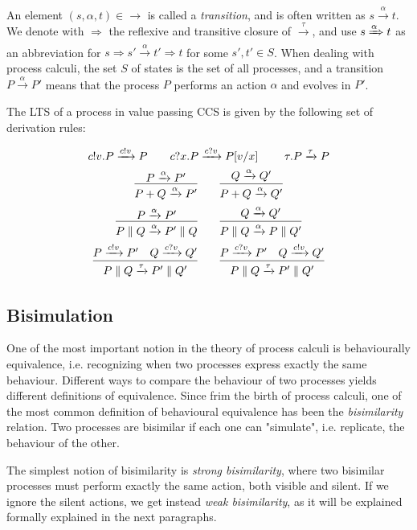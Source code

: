 An element $(s, \alpha, t) \in \rightarrow$ is called a \textit{transition}, and is often written as $s \xrightarrow{\alpha} t$. We denote with $\Rightarrow$ the reflexive and transitive closure of $\xrightarrow{\tau}$, and use $s \xRightarrow{\alpha} t$ as an abbreviation for $s \Rightarrow s' \xrightarrow{\alpha} t' \Rightarrow t$ for some $s', t' \in S$. When dealing with process calculi, the set $S$ of states is the set of all processes, and a transition $P \xrightarrow{\alpha} P'$ means that the process $P$ performs an action $\alpha$ and evolves in $P'$.

The LTS of a process in value passing CCS is given by the following set of derivation rules: 

\begin{gather*}
c!v.P \xrightarrow{c!v} P \qquad c?x.P \xrightarrow{c?v} P[v/x] \qquad \	\tau.P \xrightarrow{\tau} P
\\
\infer{P + Q \xrightarrow{\alpha} P'}{P \xrightarrow{\alpha} P'} \qquad \infer{P + Q \xrightarrow{\alpha} Q'}{Q \xrightarrow{\alpha} Q'} 
\\
\infer{P \parallel Q \xrightarrow{\alpha} P'\parallel Q}{P \xrightarrow{\alpha} P'} \qquad \infer{P \parallel Q \xrightarrow{\alpha} P\parallel Q'}{Q \xrightarrow{\alpha} Q'} 
\\
\infer{P \parallel Q \xrightarrow{\tau} P'\parallel Q'}{P \xrightarrow{c!v} P' & Q \xrightarrow{c?v} Q' } \qquad
\infer{P \parallel Q \xrightarrow{\tau} P'\parallel Q'}{P \xrightarrow{c?v} P' & Q \xrightarrow{c!v} Q' } 
\\
\end{gather*}

\subsection{Bisimulation}

One of the most important notion in the theory of process calculi is behaviourally equivalence, i.e. recognizing when two processes express exactly the same behaviour. Different ways to compare the behaviour of two processes yields different definitions of equivalence. Since frim the birth of process calculi, one of the most common definition of behavioural equivalence has been the \textit{bisimilarity} relation. Two processes are bisimilar if each one can "simulate", i.e. replicate, the behaviour of the other. 

The simplest notion of bisimilarity is \textit{strong bisimilarity}, where two bisimilar processes must perform exactly the same action, both visible and silent. If we ignore the silent actions, we get instead \textit{weak bisimilarity}, as it will be explained formally   explained in the next paragraphs.


